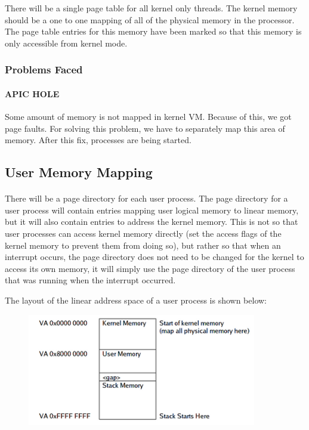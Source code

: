 \documentclass[11pt]{article}
\begin{document}
There will be a single page table for all kernel only threads. The kernel memory should be a one to one mapping of all of the physical memory in the processor. The page table entries for this memory have been marked so that this memory is only accessible from kernel mode.

\subsubsection{Problems Faced}
\paragraph{APIC HOLE}

Some amount of memory is not mapped in kernel VM. Because of this, we got page faults. For solving this problem, we have to separately map this area of memory.
After this fix, processes are being started.



\subsection{User Memory Mapping}
\paragraph{}
There will be a page directory for each user process. The page directory for a user process will contain entries mapping user logical memory to linear memory, but it will also contain entries to address the kernel memory. This is not so that user processes can access kernel memory directly (set the access flags of the kernel memory to prevent them from doing so), but rather so that when an interrupt occurs, the page directory does not need to be changed for the kernel to access its own memory, it will simply use the page directory of the user process that was running when the interrupt occurred. 

The layout of the linear address space of a user process is shown below:


\begin{figure}[ht!]
	\centering
	\includegraphics[width=100mm]{vm.png}
	\label{Two level Page Table}
\end{figure}
\end{document}
